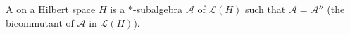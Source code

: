 \begin{definition}
A  on a Hilbert space $H$ is a $*$-subalgebra $\mathcal{A}$ of $\mathcal{L}(H)$ such that $\mathcal{A} = \mathcal{A}''$ (the bicommutant of $\mathcal{A}$ in $\mathcal{L}(H)$).
\end{definition}
